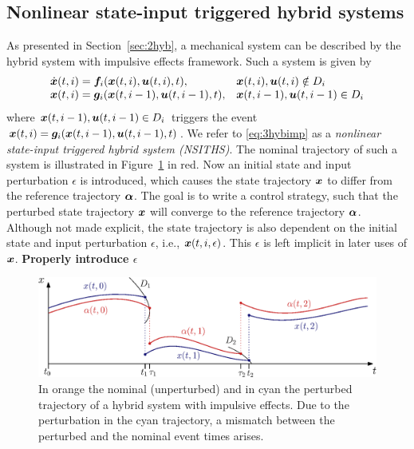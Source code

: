 \documentclass[../DC2017114Bouma.tex]{subfiles}
\begin{document}
\subsection{Nonlinear state-input triggered hybrid systems}
As presented in Section~\ref{sec:2hyb}, a mechanical system can be described by the hybrid system with impulsive effects framework. Such a system is given by
\begin{equation}
\begin{array}{ll}
\dot{{\boldsymbol{x}}}(t,i) ={\boldsymbol{f}}_i({\boldsymbol{x}}(t,i),{\boldsymbol{u}}(t,i),t),& {\boldsymbol{x}}(t,i),{\boldsymbol{u}}(t,i)\notin D_i\\
{\boldsymbol{x}}(t,i) = {\boldsymbol{g}}_i({\boldsymbol{x}}(t,i-1),{\boldsymbol{u}}(t,i-1),t),& {\boldsymbol{x}}(t,i-1),{\boldsymbol{u}}(t,i-1)\in D_i
\end{array}\label{eq:3hybimp}
\end{equation}
where ${\boldsymbol{x}}(t,i-1),{\boldsymbol{u}}(t,i-1)\in D_i$ triggers the event ${\boldsymbol{x}}(t,i) = {\boldsymbol{g}}_i({\boldsymbol{x}}(t,i-1),{\boldsymbol{u}}(t,i-1),t)$. We refer to \eqref{eq:3hybimp} as a \textit{nonlinear state-input triggered hybrid system (NSITHS)}. The nominal trajectory of such a system is illustrated in Figure~\ref{fig:3perturbedtraj} in red. Now an initial state and input perturbation $\epsilon$ is introduced, which causes the state trajectory ${\boldsymbol{x}}$ to differ from the reference trajectory $\boldsymbol{\alpha}$. The goal is to write a control strategy, such that the perturbed state trajectory ${\boldsymbol{x}}$ will converge to the reference trajectory $\boldsymbol{\alpha}$. Although not made explicit, the state trajectory is also dependent on the initial state and input perturbation $\epsilon$, i.e., ${\boldsymbol{x}}(t,i,\epsilon)$. This $\epsilon$ is left implicit in later uses of ${\boldsymbol{x}}$. \textbf{Properly introduce $\epsilon$}
%
%
\begin{figure}[h]
\centering
\includegraphics[width=.8\textwidth]{perturbedtraj.eps}\caption{In orange the nominal (unperturbed) and in cyan the perturbed trajectory of a hybrid system with impulsive effects. Due to the perturbation in the cyan trajectory, a mismatch between the perturbed and the nominal event times arises.} \label{fig:3perturbedtraj}
\end{figure}
\end{document}
